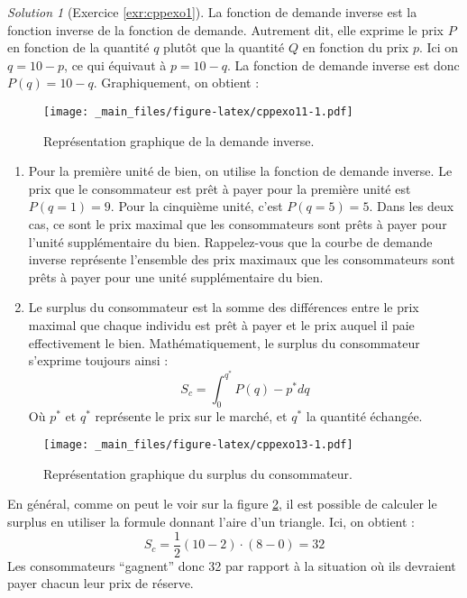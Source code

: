\documentclass[
]{book}
\theoremstyle{definition}
\theoremstyle{definition}
\theoremstyle{definition}
\theoremstyle{definition}
\theoremstyle{remark}
\newtheorem*{solution}{Solution}
\begin{document}
\begin{solution}[Exercice \ref{exr:cppexo1}]
La fonction de demande inverse est la fonction inverse de la fonction de demande.
Autrement dit, elle exprime le prix \(P\) en fonction de la quantité \(q\) plutôt que la quantité \(Q\) en fonction du prix \(p\).
Ici on \(q=10-p\), ce qui équivaut à \(p=10-q\).
La fonction de demande inverse est donc \(P(q)=10-q\).
Graphiquement, on obtient :

\begin{figure}
\centering
\texttt{[image: \_main\_files/figure-latex/cppexo11-1.pdf]}
\caption{\label{fig:cppexo11}Représentation graphique de la demande inverse.}
\end{figure}

\begin{enumerate}
\def\labelenumi{\arabic{enumi}.}
\setcounter{enumi}{1}
\item
  Pour la première unité de bien, on utilise la fonction de demande inverse.
  Le prix que le consommateur est prêt à payer pour la première unité est \(P(q=1)=9\).
  Pour la cinquième unité, c'est \(P(q=5)=5\).
  Dans les deux cas, ce sont le prix maximal que les consommateurs sont prêts à payer pour l'unité supplémentaire du bien.
  Rappelez-vous que la courbe de demande inverse représente l'ensemble des prix maximaux que les consommateurs sont prêts à payer pour une unité supplémentaire du bien.
\item
  Le surplus du consommateur est la somme des différences entre le prix maximal que chaque individu est prêt à payer et le prix auquel il paie effectivement le bien.
  Mathématiquement, le surplus du consommateur s'exprime toujours ainsi :
  \[
  S_c=\int_0^{q^*}P(q)-p^*dq
  \]
  Où \(p^*\) et \(q^*\) représente le prix sur le marché, et \(q^*\) la quantité échangée.
\end{enumerate}

\begin{figure}
\centering
\texttt{[image: \_main\_files/figure-latex/cppexo13-1.pdf]}
\caption{\label{fig:cppexo13}Représentation graphique du surplus du consommateur.}
\end{figure}

En général, comme on peut le voir sur la figure \ref{fig:cppexo13}, il est possible de calculer le surplus en utiliser la formule donnant l'aire d'un triangle.
Ici, on obtient :
\[S_c=\frac{1}{2}(10-2)\cdot(8-0)=32\]
Les consommateurs ``gagnent'' donc 32 par rapport à la situation où ils devraient payer chacun leur prix de réserve.
\end{solution}
\end{document}
